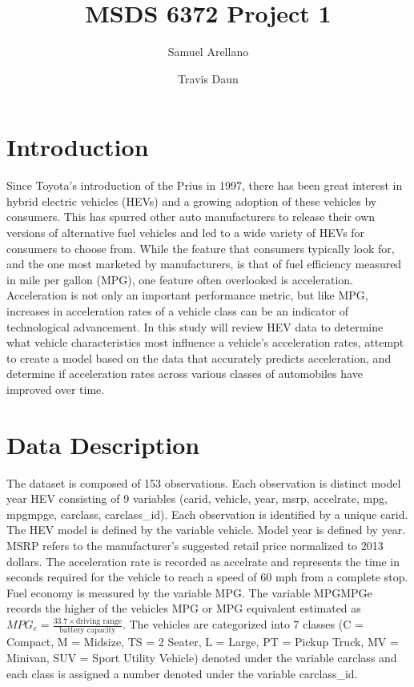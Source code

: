 \documentclass[acmsmall]{acmart}
\begin{document}
\title{MSDS 6372 Project 1}
\author{Samuel Arellano}
\author{Travis Daun}


\begin{abstract}

\end{abstract}

\maketitle


\thispagestyle{plain}
\section{Introduction}
Since Toyota’s introduction of the Prius in 1997, there has been great interest in hybrid electric vehicles (HEVs) and a growing adoption of these vehicles by consumers. This has spurred other auto manufacturers to release their own versions of alternative fuel vehicles and led to a wide variety of HEVs for consumers to choose from. While the feature that consumers typically look for, and the one most marketed by manufacturers, is that of fuel efficiency measured in mile per gallon (MPG), one feature often overlooked is acceleration. Acceleration is not only an important performance metric, but like MPG, increases in acceleration rates of a vehicle class can be an indicator of technological advancement. In this study will review HEV data to determine what vehicle characteristics most influence a vehicle’s acceleration rates, attempt to create a model based on the data that accurately predicts acceleration, and determine if acceleration rates across various classes of automobiles have improved over time.
\section{Data Description}
The dataset is composed of 153 observations.  Each observation is distinct model year HEV consisting of 9 variables (carid, vehicle, year, msrp, accelrate, mpg, mpgmpge, carclass, carclass\_id). Each observation is identified by a unique carid. The HEV model is defined by the variable vehicle. Model year is defined by year. MSRP refers to the manufacturer's suggested retail price normalized to 2013 dollars. The acceleration rate is recorded as accelrate and represents the time in seconds required for the vehicle to reach a speed of 60 mph from a complete stop. Fuel economy is measured by the variable MPG. The variable MPGMPGe records the higher of the vehicles MPG or MPG equivalent estimated as $MPG_e = \frac{33.7 \times \text{driving range}}{\text{battery capacity}}$. The vehicles are categorized into 7 classes (C = Compact, M = Midsize, TS = 2 Seater, L = Large, PT = Pickup Truck, MV = Minivan, SUV = Sport Utility Vehicle) denoted under the variable carclass and each class is assigned a number denoted under the variable carclass\_id. \\
\end{document}
